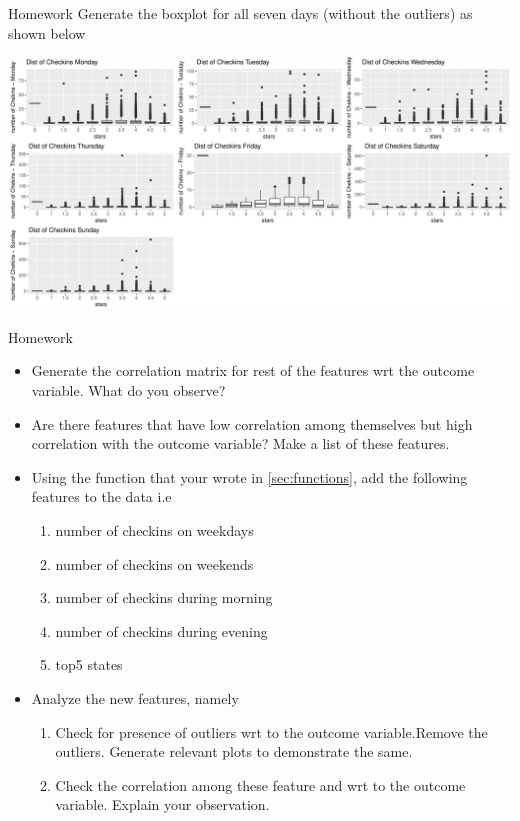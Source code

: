 \documentclass[12pt]{book}\usepackage{knitr}
\begin{document}
\begin{DIY}{Homework}
\noindent Generate the boxplot for all seven days (without the outliers) as shown below
\begin{knitrout}
\color{fgcolor}
\includegraphics[width=\maxwidth]{figure/unnamed-chunk-47-1} 

\end{knitrout}
\end{DIY}

\begin{DIY}{Homework}
  \begin{itemize}
  \item Generate the correlation matrix for rest of the features wrt the outcome variable. What do you observe? 
  \item Are there features that have low correlation among themselves but high correlation with the outcome variable? Make a list of these features.
   \item Using the function that your wrote in \ref{sec:functions}, add the following features to the data i.e
   \begin{enumerate}
      \item number of checkins on weekdays
      \item number of checkins on weekends
      \item number of checkins during morning
      \item number of checkins during evening
      \item top5 states
   \end{enumerate}
   \item  Analyze the new features, namely
   \begin{enumerate}
        \item Check for presence of outliers wrt to the outcome variable.Remove the outliers. Generate relevant plots to demonstrate the same. 
        \item Check the correlation among these feature and wrt to the outcome variable. Explain your observation.
    \end{enumerate}
\end{itemize}
\end{DIY}
\end{document}
